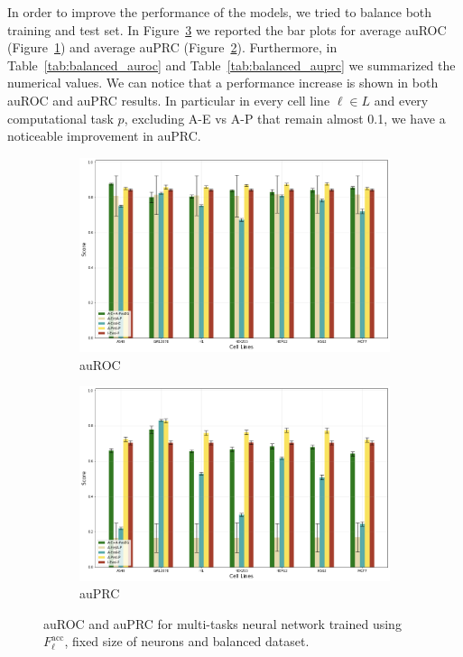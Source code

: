 In order to improve the performance of the models, we tried to balance both training and test set. In Figure~\ref{fig:balanced_results} we reported the bar plots for average auROC (Figure~\ref{fig:auroc_balanced}) and average auPRC (Figure~\ref{fig:auprc_balanced}). Furthermore, in Table~\ref{tab:balanced_auroc} and Table~\ref{tab:balanced_auprc} we summarized the numerical values. We can notice that a performance increase is shown in both auROC and auPRC results. In particular in every cell line $\ell \in L$ and every computational task $p$, excluding A-E vs A-P that remain almost 0.1, we have a noticeable improvement in auPRC.  
%
\begin{figure}[!htbp]
    \centering
    \begin{subfigure}[b]{\textwidth}
        \includegraphics[width=\textwidth]{images/results_plots/balanced_dataset_auroc.png}
        \caption{auROC}
        \label{fig:auroc_balanced}
    \end{subfigure}
    \begin{subfigure}[b]{\textwidth}
        \includegraphics[width=\textwidth]{images/results_plots/balanced_dataset_auprc.png}
        \caption{auPRC}
        \label{fig:auprc_balanced}
    \end{subfigure}
    \caption{auROC and auPRC for multi-tasks neural network trained using $F_\ell^{\textrm{acc}}$, fixed size of neurons and balanced dataset.}
    \label{fig:balanced_results}
\end{figure}

